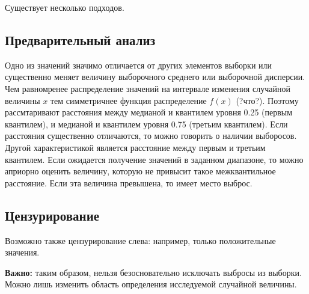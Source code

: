 \documentclass[12pt]{article}
\begin{document}
Существует несколько подходов.

\subsection{Предварительный анализ}
Одно из значений значимо отличается от других элементов выборки или существенно меняет величину выборочного среднего или выборочной дисперсии. Чем равномренее распределение значений на интервале изменения случайной величины $x$ тем симметричнее функция распределение $f(x)$ (?что?). Поэтому рассмтаривают расстояния между медианой и квантилем уровня 0.25 (первым квантилем), и медианой и квантилем уровня 0.75 (третьим квантилем). Если расстояния существенно отличаются, то можно говорить о наличии выборосов. Другой характеристикой является расстояние между первым и третьим квантилем. Если ожидается получение значений в заданном диапазоне, то можно априорно оценить величину, которую не привысит такое межквантильное расстояние. Если эта величина превышена, то имеет место выброс.

\subsection{Цензурирование}
Возможно также цензурирование слева: например, только положительные значения.

\begin{framed}
\textbf{Важно:} таким образом, нельзя безосновательно исключать выбросы из выборки. Можно лишь изменить область определения исследуемой случайной величины.  
\end{framed}
\end{document}
